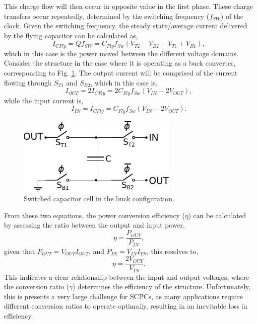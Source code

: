 	This charge flow will then occur in opposite value in the first phase. These charge transfers occur repeatedly, determined by the switching frequency ($f_{SW}$) of the clock. Given the switching frequency, the steady state/average current delivered by the flying capacitor can be calculated as,
	\begin{equation}
		I_{CFly} = Qf_{SW} = C_{Fly}f_{Sw}(V_{T2} - V_{B2} - V_{T1} + V_{B1}),
	\end{equation} 
	which in this case is the power moved between the different voltage domains. Consider the structure in the case where it is operating as a buck converter, corresponding to Fig. \ref{fig:Buck}. The output current will be comprised of the current flowing through $S_{T1}$ and $S_{B2}$, which in this case is,
	\begin{equation}
		I_{OUT} = 2I_{CFly} = 2C_{Fly}f_{Sw}(V_{IN} - 2V_{OUT}),
	\end{equation} 
	while the input current is,
	\begin{equation}
		I_{IN} = I_{CFly} = C_{Fly}f_{Sw}(V_{IN} - 2V_{OUT}).
	\end{equation}
	\begin{figure}
		\centering
		\includegraphics[width=0.5\linewidth]{4Terminal/Figures/Buck.pdf}
		\caption{Switched capacitor cell in the buck configuration.}
		\label{fig:Buck}
	\end{figure}
	From these two equations, the power conversion efficiency ($\eta$) can be calculated by assessing the ratio between the output and input power,
	\begin{equation}
		\eta = \frac{P_{OUT}}{P_{IN}},
	\end{equation}	
	given that $P_{OUT} = V_{OUT}I_{OUT}$, and $P_{IN} = V_{IN}I_{IN}$, this resolves to,
	\begin{equation}
		\eta = \frac{2V_{OUT}}{V_{IN}}.
	\end{equation} 
	This indicates a clear relationship between the input and output voltages, where the conversion ratio ($\gamma$) determines the efficiency of the structure. Unfortunately, this is presents a very large challenge for SCPCs, as many applications require different conversion ratios to operate optimally, resulting in an inevitable loss in efficiency.
	
